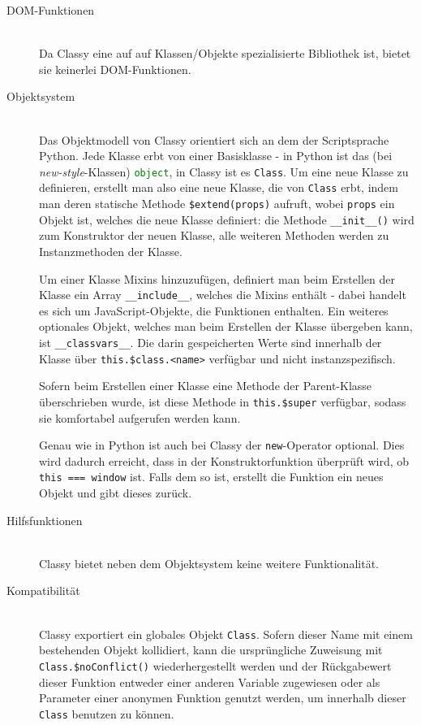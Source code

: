 \begin{description}
\item[DOM-Funktionen] \hfill \\
Da Classy eine auf auf Klassen/Objekte spezialisierte Bibliothek ist, bietet sie keinerlei
DOM-Funktionen.

\item[Objektsystem] \hfill \\
Das Objektmodell von Classy orientiert sich an dem der Scriptsprache Python. Jede Klasse erbt von
einer Basisklasse - in Python ist das (bei \emph{new-style}-Klassen)
\lstinline[language=Python]{object}, in Classy ist es \lstinline{Class}. Um eine neue Klasse zu
definieren, erstellt man also eine neue Klasse, die von \lstinline{Class} erbt, indem man deren
statische Methode \lstinline{$extend(props)} aufruft, wobei \lstinline{props} ein Objekt ist,
welches die neue Klasse definiert: die Methode \lstinline{__init__()} wird zum Konstruktor der neuen
Klasse, alle weiteren Methoden werden zu Instanzmethoden der Klasse.

Um einer Klasse Mixins hinzuzufügen, definiert man beim Erstellen der Klasse ein Array
\lstinline{__include__}, welches die Mixins enthält - dabei handelt es sich um JavaScript-Objekte,
die Funktionen enthalten. Ein weiteres optionales Objekt, welches man beim Erstellen der Klasse
übergeben kann, ist \lstinline{__classvars__}. Die darin gespeicherten Werte sind innerhalb der
Klasse über \lstinline{this.$class.<name>} verfügbar und nicht instanzspezifisch.

Sofern beim Erstellen einer Klasse eine Methode der Parent-Klasse überschrieben wurde, ist diese
Methode in \lstinline{this.$super} verfügbar, sodass sie komfortabel aufgerufen werden kann.

Genau wie in Python ist auch bei Classy der \lstinline{new}-Operator optional. Dies wird dadurch
erreicht, dass in der Konstruktorfunktion überprüft wird, ob \lstinline{this === window} ist. Falls
dem so ist, erstellt die Funktion ein neues Objekt und gibt dieses zurück.

\item[Hilfsfunktionen] \hfill \\
Classy bietet neben dem Objektsystem keine weitere Funktionalität.

\item[Kompatibilität] \hfill \\
Classy exportiert ein globales Objekt \lstinline{Class}. Sofern dieser Name mit einem bestehenden
Objekt kollidiert, kann die ursprüngliche Zuweisung mit \lstinline{Class.$noConflict()}
wiederhergestellt werden und der Rückgabewert dieser Funktion entweder einer anderen Variable
zugewiesen oder als Parameter einer anonymen Funktion genutzt werden, um innerhalb dieser
\lstinline{Class} benutzen zu können.


\end{description}
